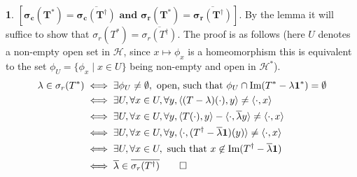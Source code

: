 \documentclass[11pt]{article}
\theoremstyle{definition}
\newtheorem{pb}{}
\newcommand{\set}[1]{\{#1\}}
\newcommand{\tand}{\text{ and }}
\newcommand{\im}{\text{Im}}
\newcommand{\gen}[1]{\langle #1 \rangle}
\begin{document}
\begin{pb}
        \(\mathbf{[\sigma_c(T^*) = \overline{\sigma_c(T^\dagger)} \tand \sigma_r(T^*) = \overline{\sigma_r(T^\dagger)}].}\) By the lemma it will suffice to show that \(\sigma_r(T^*) = \overline{\sigma_r(T^\dagger)}\). The proof is as follows (here \(U\) denotes a non-empty open set in \(\mathcal{H}\), since \(x \mapsto \phi_x\) is a homeomorphism this is equivalent to the set \(\phi_U = \set{\phi_x \mid x \in U} \) being non-empty and open in \(\mathcal{H}^*\)).
        \begin{align*}
            \lambda \in \sigma_r(T^*) &\iff \exists \phi_U \neq \emptyset, \text{ open, such that } \phi_U \cap \im(T^* - \lambda \mathbf{1}^*) = \emptyset \\
            &\iff \exists U, \forall x \in U, \forall y, \gen{(T - \lambda)(\cdot),y} \neq \gen{\cdot,x} \\
            &\iff \exists U, \forall x \in U, \forall y, \gen{T(\cdot),y} - \gen{\cdot,\overline{\lambda}y}  \neq \gen{\cdot,x} \\
            &\iff \exists U, \forall x \in U, \forall y, \gen{\cdot,(T^\dagger - \overline{\lambda}\mathbf{1})(y)} \neq \gen{\cdot,x} \\
            &\iff \exists U, \forall x \in U, \text{ such that } x \not \in \im(T^\dagger - \overline{\lambda}\mathbf{1}) \\
            &\iff \overline{\lambda} \in \overline{\sigma_r(T^\dagger)} \qed
        \end{align*}
    \end{pb}
\end{document}
